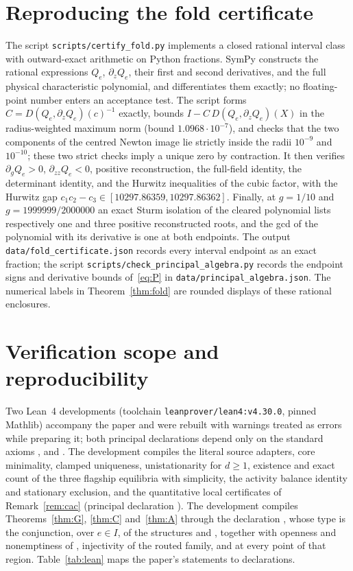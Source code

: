 \documentclass[11pt,a4paper]{article}
\theoremstyle{plain}
\theoremstyle{definition}
\theoremstyle{remark}
\begin{document}
\section{Reproducing the fold certificate}\label{app:fold}

The script \texttt{scripts/certify\_fold.py} implements a closed rational interval class with outward-exact arithmetic on Python fractions. SymPy constructs the rational expressions $Q_e$, $\partial_zQ_e$, their first and second derivatives, and the full physical characteristic polynomial, and differentiates them exactly; no floating-point number enters an acceptance test. The script forms $C=D(Q_e,\partial_zQ_e)(c)^{-1}$ exactly, bounds $I-C\,D(Q_e,\partial_zQ_e)(X)$ in the radius-weighted maximum norm (bound $1.0968\cdot10^{-7}$), and checks that the two components of the centred Newton image lie strictly inside the radii $10^{-9}$ and $10^{-10}$; these two strict checks imply a unique zero by contraction. It then verifies $\partial_gQ_e>0$, $\partial_{zz}Q_e<0$, positive reconstruction, the full-field identity, the determinant identity, and the Hurwitz inequalities of the cubic factor, with the Hurwitz gap $c_1c_2-c_3\in[10297.86359,10297.86362]$. Finally, at $g=1/10$ and $g=1999999/2000000$ an exact Sturm isolation of the cleared polynomial lists respectively one and three positive reconstructed roots, and the gcd of the polynomial with its derivative is one at both endpoints. The output \texttt{data/fold\_certificate.json} records every interval endpoint as an exact fraction; the script \texttt{scripts/check\_principal\_algebra.py} records the endpoint signs and derivative bounds of~\eqref{eq:P} in \texttt{data/principal\_algebra.json}. The numerical labels in Theorem~\ref{thm:fold} are rounded displays of these rational enclosures.

\section{Verification scope and reproducibility}\label{app:verification}

Two Lean~4 developments (toolchain \texttt{leanprover/lean4:v4.30.0}, pinned Mathlib) accompany the paper and were rebuilt with warnings treated as errors while preparing it; both principal declarations depend only on the standard axioms ,  and . The development  compiles the literal source adapters, core minimality, clamped uniqueness, unistationarity for $d\ge1$, existence and exact count of the three flagship equilibria with simplicity, the activity balance identity and stationary exclusion, and the quantitative local certificates of Remark~\ref{rem:cac} (principal declaration ). The development  compiles Theorems~\ref{thm:G}, \ref{thm:C} and~\ref{thm:A} through the declaration , whose type is the conjunction, over $e\in I$, of the structures  and , together with openness and nonemptiness of , injectivity of the routed family, and  at every point of that region. Table~\ref{tab:lean} maps the paper's statements to declarations.
\end{document}
